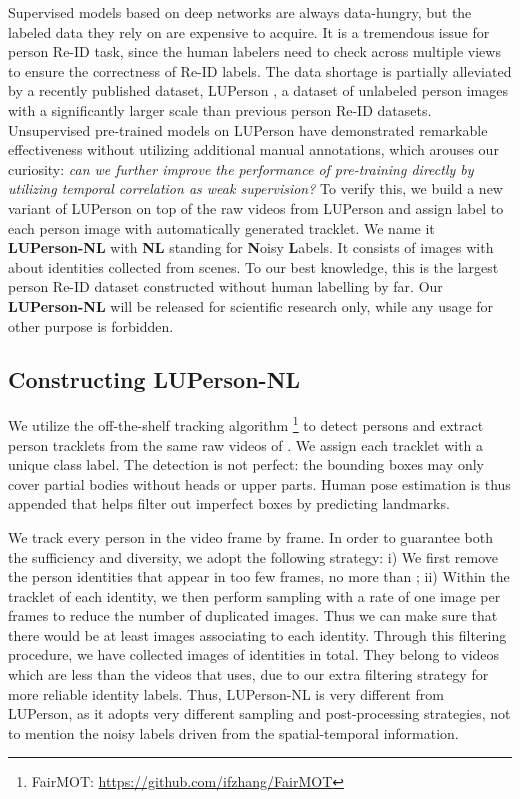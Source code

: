 \documentclass[10pt,twocolumn,letterpaper]{article}
\begin{document}
Supervised models based on deep networks are always data-hungry, but the labeled data they rely on are expensive to acquire.
It is a tremendous issue for person Re-ID task, since the human labelers need to check across multiple views to ensure the correctness of Re-ID labels.
The data shortage is partially alleviated by a recently published dataset, LUPerson \cite{fu2020unsupervised}, a dataset of unlabeled person images with a significantly larger scale than previous person Re-ID datasets. Unsupervised pre-trained models \cite{fu2020unsupervised} on LUPerson have demonstrated remarkable effectiveness without utilizing additional manual annotations, which arouses our curiosity: \emph{can we further improve the performance of pre-training directly by utilizing temporal correlation as weak supervision?} To verify this, we build a new variant of LUPerson on top of the raw videos from LUPerson and assign label to each person image with automatically generated tracklet. We name it \textbf{LUPerson-NL} with \textbf{NL} standing for \textbf{N}oisy \textbf{L}abels. It consists of  images with about  identities collected from  scenes. To our best knowledge, this is the largest person Re-ID dataset constructed without human labelling by far. Our \textbf{LUPerson-NL} will be released for scientific research only, while any usage for other purpose is forbidden. 

\subsection{Constructing LUPerson-NL}
\label{ssec:construct-luperson-nl}


We utilize the off-the-shelf tracking algorithm \cite{zhang2020fairmot} \footnote{FairMOT: \url{https://github.com/ifzhang/FairMOT}} to detect persons and extract person tracklets from the same raw videos of \cite{fu2020unsupervised}. We assign each tracklet with a unique class label.
The detection is not perfect: \eg the bounding boxes may only cover partial bodies without heads or upper parts. 
Human pose estimation \cite{SunXLW19} is thus appended that helps filter out imperfect boxes by predicting landmarks.

We track every person in the video frame by frame. In order to guarantee both the sufficiency and diversity, we adopt the following strategy: 
i) We first remove the person identities that appear in too few frames, \ie no more than ;
ii) Within the tracklet of each identity, we then perform sampling with a rate of one image per  frames to reduce the number of duplicated images.
Thus we can make sure that there would be at least  images associating to each identity.
Through this filtering procedure, we have collected  images of  identities in total. 
They belong to  videos which are less than the videos that \cite{fu2020unsupervised} uses, due to our extra filtering strategy for more reliable identity labels. Thus, LUPerson-NL is very different from LUPerson, as it adopts very different sampling and post-processing strategies, not to mention the noisy labels driven from the spatial-temporal information.
\end{document}
